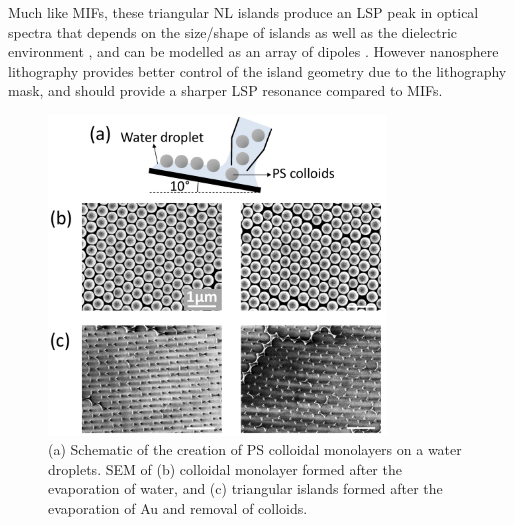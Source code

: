 Much like MIFs, these triangular NL islands produce an LSP peak in optical spectra that depends on the size/shape of islands as well as the dielectric environment \cite{Jensen2000}, and can be modelled as an array of dipoles \cite{Malinsky2001, Jensen1999}. However nanosphere lithography provides better control of the island geometry due to the lithography mask, and should provide a sharper LSP resonance compared to MIFs.

\begin{figure}[h!] 
\centering    
\includegraphics[width=0.8\textwidth]{Fig9}
\caption{(a) Schematic of the creation of PS colloidal monolayers on a water droplets. SEM of (b) colloidal monolayer formed after the evaporation of water, and (c) triangular islands formed after the evaporation of Au and removal of colloids.}
\label{6Fig9}
\end{figure}
